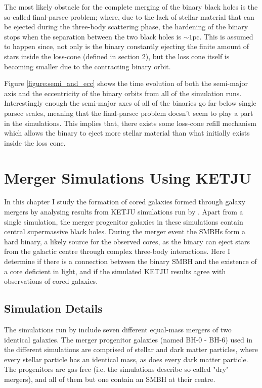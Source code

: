 \documentclass[english, oneside]{HYgradu}
\begin{document}
The most likely obstacle for the complete merging of the binary black holes is the so-called final-parsec problem; where, due to the lack of stellar material that can be ejected during the three-body scattering phase, the hardening of the binary stops when the separation between the two black holes is $\sim 1 \mathrm{pc}$. This is assumed to happen since, not only is the binary constantly ejecting the finite amount of stars inside the loss-cone (defined in section 2), but the loss cone itself is becoming smaller due to the contracting binary orbit.

Figure \ref{figure:semi_and_ecc} shows the time evolution of both the semi-major axis and the eccentricity of the binary orbits from all of the simulation runs. Interestingly enough the semi-major axes of all of the binaries go far below single parsec scales, meaning that the final-parsec problem doesn't seem to play a part in the simulations. This implies that, there exists some loss-cone refill mechanism which allows the binary to eject more stellar material than what initially exists inside the loss cone.



\chapter{Merger Simulations Using KETJU}

In this chapter I study the formation of cored galaxies formed through galaxy mergers by analysing results from KETJU simulations run by \cite{Rantala2018}. Apart from a single simulation, the merger progenitor galaxies in these simulations contain central supermassive black holes. During the merger event the SMBHs form a hard binary, a likely source for the observed cores, as the binary can eject stars from the galactic centre through complex three-body interactions. Here I determine if there is a connection between the binary SMBH and the existence of a core deficient in light, and if the simulated KETJU results agree with observations of cored galaxies.


\section{Simulation Details}

The simulations run by \cite{Rantala2018} include seven different equal-mass mergers of two identical galaxies. The merger progenitor galaxies (named BH-0 - BH-6) used in the different simulations are comprised of stellar and dark matter particles, where every stellar particle has an identical mass, as does every dark matter particle. The progenitors are gas free (i.e. the simulations describe so-called "dry" mergers), and all of them but one contain an SMBH at their centre.
\end{document}
